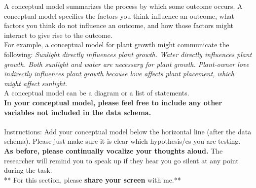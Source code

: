 A conceptual model summarizes the process by which some outcome
occurs. A conceptual model specifies the factors you think influence an outcome,
what factors you think do not influence an outcome, and how those factors might
interact to give rise to the outcome. \\

For example, a conceptual model for plant growth might communicate the
following: \textit{Sunlight directly influences plant growth. Water directly influences
plant growth. Both sunlight and water are necessary for plant growth.
Plant-owner love indirectly influences plant growth because love affects plant
placement, which might affect sunlight.} \\

A conceptual model can be a diagram or a list of statements. \\

\textbf{In your conceptual model, please feel free to include any
other variables not included in the data schema.}\\

\hfill \\

Instructions: Add your conceptual model below the horizontal line (after the
data schema). Please just make sure it is clear which hypothesis/es you are
testing.\\


\textbf{As before, please continually vocalize your thoughts aloud.} The researcher will
remind you to speak up if they hear you go silent at any point during the task.\\

** For this section, please \textbf{share your screen} with me.**


